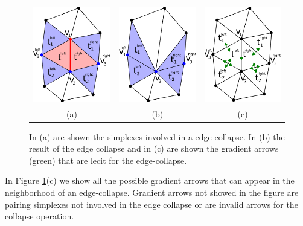 \documentclass[preprint,5p,times,onecolumn]{article}
\begin{document}
\begin{figure}
	\begin{tabular}{c c c}
		\includegraphics[width=0.33\linewidth]{images/before_edge_collapse} &
		\includegraphics[width=0.33\linewidth]{images/after_edge_collapse} &
		\includegraphics[width=0.33\linewidth]{images/gradient_conf} \\
		(a) & (b) & (c) \\
	\end{tabular}
	\label{fig:notation}
	\caption{In (a) are shown the simplexes involved in a edge-collapse. In (b) the result of the edge collapse and in (c) are shown the gradient arrows (green) that are lecit for the edge-collapse.}
\end{figure}

In Figure \ref{fig:notation}(c) we show all the possible gradient arrows that can appear in the neighborhood of an edge-collapse. Gradient arrows not showed in the figure are pairing simplexes not involved in the edge collapse or are invalid arrows for the collapse operation. 
\end{document}
